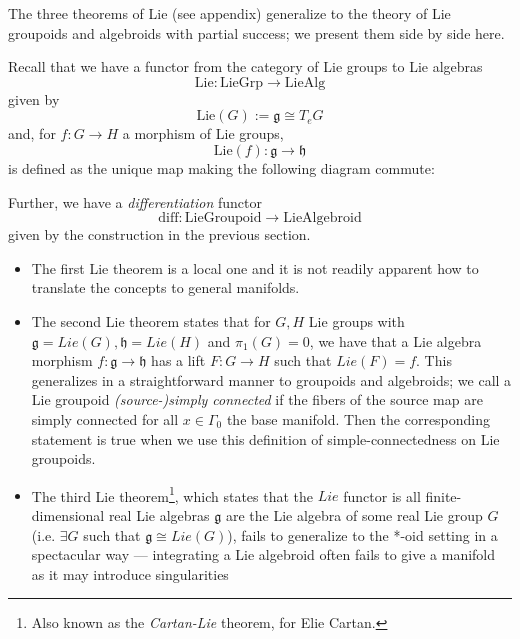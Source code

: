 The three theorems of Lie (see appendix) generalize to the theory of Lie groupoids and algebroids with partial success; we present them side by side here.
\begin{thrm}

Recall that we have a functor from the category of Lie groups to Lie algebras
$$
\mathrm{Lie}: \mathrm{LieGrp} \to \mathrm{LieAlg}
$$
given by
$$
\mathrm{Lie}(G) := \mathfrak{g} \cong T_e G
$$
and, for $f: G \to H$ a morphism of Lie groups,
$$
\mathrm{Lie}(f): \mathfrak{g} \to \mathfrak{h}
$$
is defined as the unique map making the following diagram commute:

Further, we have a \emph{differentiation} functor
$$
\mathrm{diff}: \mathrm{LieGroupoid} \to \mathrm{LieAlgebroid}
$$
given by the construction in the previous section.


\begin{itemize}
\item The first Lie theorem is a local one and it is not readily apparent how to translate the concepts to general manifolds.

\item The second Lie theorem states that for $G,H$ Lie groups with $\mathfrak{g} = Lie(G), \mathfrak{h} = Lie(H)$ and $\pi_1(G) = 0$, we have that a Lie algebra morphism $f: \mathfrak{g} \to \mathfrak{h}$ has a lift $F: G \to H$ such that $Lie(F) = f$. This generalizes in a straightforward manner to groupoids and algebroids; we call a Lie groupoid \emph{(source-)simply connected} if the fibers of the source map are simply connected for all $x \in \Gamma_0$ the base manifold. Then the corresponding statement is true when we use this definition of simple-connectedness on Lie groupoids.

\item The third Lie theorem\footnote{Also known as the \emph{Cartan-Lie} theorem, for Elie Cartan.}, which states that the $Lie$ functor is all finite-dimensional real Lie algebras $\mathfrak{g}$ are the Lie algebra of some real Lie group $G$ (i.e. $\exists G$ such that $\mathfrak{g} \cong Lie(G)$), fails to generalize to the *-oid setting in a spectacular way --- integrating a Lie algebroid often fails to give a manifold as it may introduce singularities %

\end{itemize}
\end{thrm}

